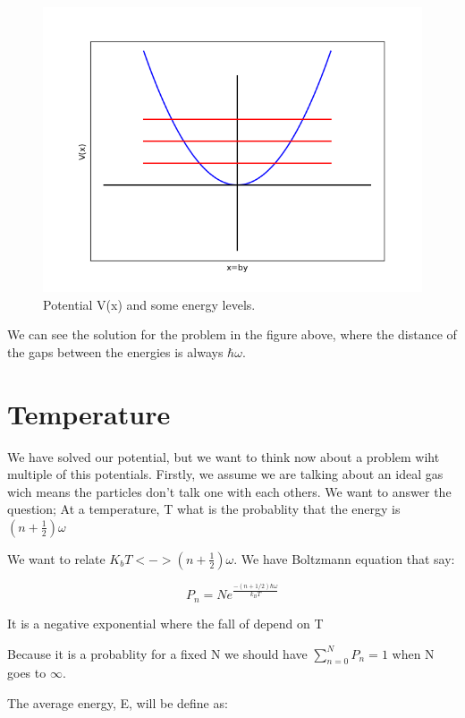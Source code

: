 \begin{figure}[H]
  \centering
  \includegraphics{images7/sol.png}
  \caption{Potential V(x) and some energy levels.}
\end{figure}

We can see the solution for the problem in the figure above, where the distance of the gaps between the energies is always $\hbar\omega$.


\section{Temperature}

We have solved our potential, but we want to think now about a problem wiht multiple of this potentials. Firstly, we assume we are talking about an ideal gas wich means the particles don't talk one with each others. We want to answer the question; At a temperature, T what is the probablity that the energy is $\left(n+\frac{1}{2}\right)\omega$

We want to relate $K_b T <-> \left(n+\frac{1}{2}\right)\omega$. We have Boltzmann equation that say:

\begin{equation}
  P_n = Ne^{\frac{-(n+1/2)\hbar\omega}{k_B T}}
\end{equation}

It is a negative exponential where the fall of depend on T

Because it is a probablity for a fixed N we should have $\sum_{n=0}^{N}P_n = 1$ when N goes to $\infty$.

The average energy, E, will be define as:

